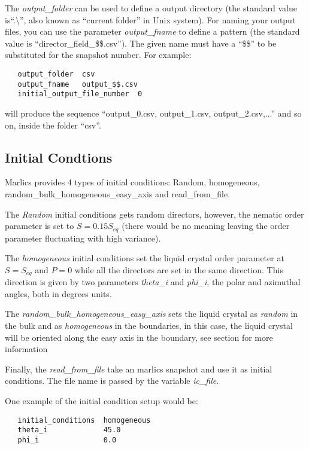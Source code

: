 \documentclass{article}
\begin{document}
The \textit{output\_folder} can be used to define a output directory
(the standard value is``.\textbackslash'', also known as ``current
folder'' in Unix system).  For naming your output files, you can use
the parameter \textit{output\_fname} to define a pattern (the standard
value is ``director\_field\_\$\$.csv'').  The given name must have a
``\$\$'' to be substituted for the snapshot number. For example:
\begin{lstlisting}
   output_folder  csv
   output_fname   output_$$.csv
   initial_output_file_number  0	
\end{lstlisting}
will produce the sequence ``output\_0.csv, output\_1.csv, output\_2.csv,...'' and so on, inside the folder ``csv''.  


\subsection{Initial Condtions}\label{ic.params}

Marlics provides 4 types of initial conditions: Random, homogeneous, random_bulk_homogeneous_easy_axis and read_from_file.

The \textit{Random} initial conditions gets random directors, however,
the nematic order parameter is set to $S=0.15 S_{eq}$ (there would be
no meaning leaving the order parameter fluctuating with high
variance).

The \textit{homogeneous} initial conditions set the liquid crystal
order parameter at $S=S_{eq}$ and $P=0$ while all the directors are
set in the same direction. This direction is given by two parameters
\textit{theta_i} and \textit{phi_i}, the polar and azimuthal angles,
both in degrees units.

The \textit{random_bulk_homogeneous_easy_axis} sets the liquid crystal
as \textit{random} in the bulk and as \textit{homogeneous} in the
boundaries, in this case, the liquid crystal will be oriented along
the easy axis in the boundary, see section \label{ssec:boundary} for
more information

Finally, the \textit{read_from_file} take an marlics snapshot and use
it as initial conditions. The file name is passed by the variable
\textit{ic_file}.

One example of the initial condition setup would be:
\begin{lstlisting}
   initial_conditions  homogeneous
   theta_i             45.0
   phi_i               0.0	
\end{lstlisting}
\end{document}
